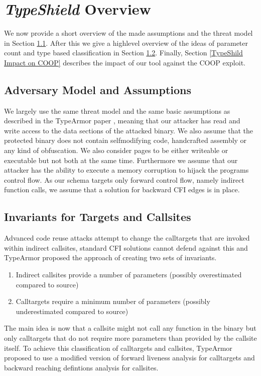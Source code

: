 \chapter{\textit{TypeShield} Overview}
\label{chapter:TypeShild Overview}
We now provide a short overview of the made assumptions and the threat model in Section \ref{Adversary Model}. After this we give a highlevel overview of the ideas of parameter count and type based classification in Section \ref{Invariants for Targets and Callsites}. Finally, Section \ref{TypeShild Impact on COOP} describes the impact of our tool against the COOP exploit.

\section{Adversary Model and Assumptions}
\label{Adversary Model}
We largely use the same threat model and the same basic assumptions as described in the TypeArmor paper \cite{veen:typearmor}, meaning that our attacker has read and write access to the data sections of the attacked binary.  We also assume that the protected binary does not contain selfmodifying code, handcrafted assembly or any kind of obfuscation. We also consider pages to be either writeable or executable but not both at the same time. Furthermore we assume that our attacker has the ability to execute a memory corruption to hijack the programs control flow. As our schema targets only forward control flow, namely indirect function calls, we assume that a solution for backward CFI edges is in place.


\section{Invariants for Targets and Callsites}
\label{Invariants for Targets and Callsites}
Advanced code reuse attacks attempt to change the calltargets that are invoked within indirect callsites, standard CFI solutions cannot defend against this and TypeArmor proposed the approach of creating two sets of invariants. 

\begin{enumerate}
\item Indirect callsites provide a number of parameters (possibly overestimated compared to source)
\item Calltargets require a minimum number of parameters (possibly underestimated compared to source)
\end{enumerate}

The main idea is now that a callsite might not call any function in the binary but only calltargets that do not require more parameters than provided by the callsite itself. To achieve this classification of calltargets and callsites, TypeArmor proposed to use a modified version of forward liveness analysis for calltargets and backward reaching defintions analysis for callsites.



